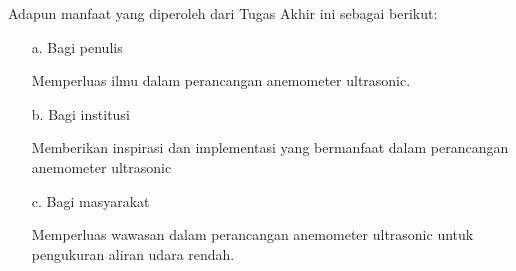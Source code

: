 Adapun manfaat yang diperoleh dari Tugas Akhir ini sebagai berikut:
\begin{enumerate}
	\item [a.]	Bagi penulis 
	
	Memperluas ilmu dalam perancangan anemometer ultrasonic.
	
	\item [b.]	Bagi institusi
	
	 Memberikan inspirasi dan implementasi yang bermanfaat dalam perancangan anemometer ultrasonic
	
	\item [c.]	Bagi masyarakat
	
	Memperluas wawasan dalam perancangan anemometer ultrasonic untuk pengukuran aliran udara rendah.
	
\end{enumerate}
